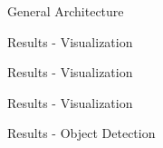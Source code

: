\begin{frame}{General Architecture}

\end{frame}

\begin{frame}{Results - Visualization}

\end{frame}

\begin{frame}{Results - Visualization}

\end{frame}

\begin{frame}{Results - Visualization}

\end{frame}

\begin{frame}{Results - Object Detection}
\end{frame}

